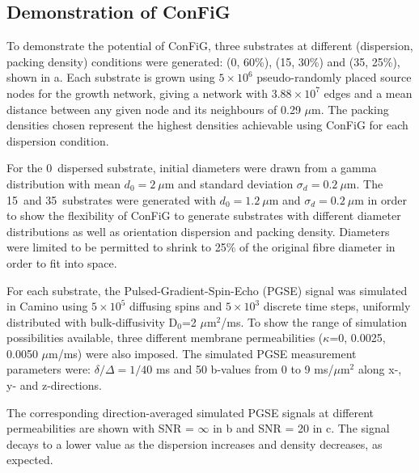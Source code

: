 \subsection{Demonstration of ConFiG}
\label{sec:ipmi_demonstration}
To demonstrate the potential of ConFiG, three substrates at different (dispersion, packing density) conditions were generated: (0\degree, 60\%), (15\degree, 30\%) and (35\degree, 25\%), shown in a.
Each substrate is grown using $5 \times 10^6$ pseudo-randomly placed source nodes for the growth network, giving a network with $3.88\times10^7$  edges and a mean distance between any given node and its neighbours of 0.29 $\mu$m.
The packing densities chosen represent the highest densities achievable using ConFiG for each dispersion condition.


For the 0\degree\ dispersed substrate, initial diameters were drawn from a gamma distribution with mean $d_0 = 2\ \mu$m and standard deviation $\sigma_d = 0.2\ \mu$m. The 15\degree\ and 35\degree\ substrates were generated with $d_0 = 1.2\ \mu$m and $\sigma_d = 0.2\ \mu$m in order to show the flexibility of ConFiG to generate substrates with different diameter distributions as well as orientation dispersion and packing density. Diameters were limited to be permitted to shrink to 25\% of the original fibre diameter in order to fit into space.

For each substrate, the Pulsed-Gradient-Spin-Echo (PGSE) signal was simulated in Camino\cite{Cook2006} using $5\times 10^5$ diffusing spins and $5\times 10^3$ discrete time steps, uniformly distributed with bulk-diffusivity D$_0$=2 $\mu$m$^2$/ms. To show the range of simulation possibilities available, three different membrane permeabilities ($\kappa$=0, 0.0025, 0.0050 $\mu$m/ms) were also imposed.
The simulated PGSE measurement parameters were: $\delta/\Delta=1/40$ ms and 50 b-values from 0 to 9 ms/$\mu$m$^2$ along x-, y- and z-directions.

The corresponding direction-averaged simulated PGSE signals at different permeabilities are shown with SNR = $\infty$ in b and SNR = 20 in c.
The signal decays to a lower value as the dispersion increases and density decreases, as expected.

